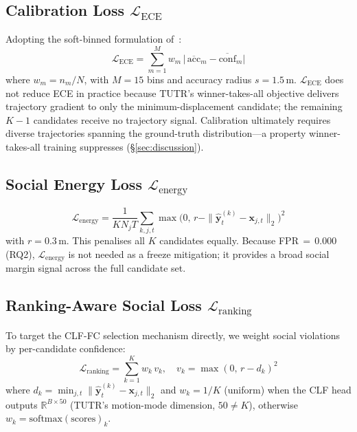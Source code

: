 \documentclass[journal]{IEEEtran}
\begin{document}
\subsection{Calibration Loss \texorpdfstring{$\mathcal{L}_{\text{ECE}}$}{L\_ECE}}

Adopting the soft-binned formulation of~\cite{karandikar2021soft}:
\begin{equation}
  \mathcal{L}_{\text{ECE}} = \sum_{m=1}^{M} w_m\,
  \bigl|\,\overline{\mathrm{acc}}_m - \overline{\mathrm{conf}}_m\bigr|
  \label{eq:lece}
\end{equation}
where $w_m=n_m/N$, with $M{=}15$ bins and accuracy radius
$s{=}1.5$\,m.
$\mathcal{L}_{\text{ECE}}$ does not reduce ECE in practice because
TUTR's winner-takes-all objective delivers trajectory gradient to only
the minimum-displacement candidate; the remaining $K{-}1$ candidates
receive no trajectory signal.
Calibration ultimately requires diverse trajectories spanning the
ground-truth distribution---a property winner-takes-all training
suppresses (\S\ref{sec:discussion}).

\subsection{Social Energy Loss \texorpdfstring{$\mathcal{L}_{\text{energy}}$}{L\_energy}}

\begin{equation}
  \mathcal{L}_{\text{energy}} = \frac{1}{KN_jT}
  \sum_{k,j,t}\max\!\bigl(0,\,r-\|\hat{\mathbf{y}}^{(k)}_t
  -\mathbf{x}_{j,t}\|_2\bigr)^2
  \label{eq:lenergy}
\end{equation}
with $r{=}0.3$\,m. This penalises all $K$ candidates equally.
Because FPR\,\(=\,0.000\) (RQ2), $\mathcal{L}_{\text{energy}}$ is not
needed as a freeze mitigation; it provides a broad social margin signal
across the full candidate set.

\subsection{Ranking-Aware Social Loss \texorpdfstring{$\mathcal{L}_{\text{ranking}}$}{L\_ranking}}

To target the CLF-FC selection mechanism directly, we weight social
violations by per-candidate confidence:
\begin{equation}
  \mathcal{L}_{\text{ranking}} = \sum_{k=1}^{K} w_k\,v_k, \quad
  v_k = \max(0,\,r-d_k)^2
  \label{eq:lranking}
\end{equation}
where $d_k=\min_{j,t}\|\hat{\mathbf{y}}^{(k)}_t-\mathbf{x}_{j,t}\|_2$
and $w_k{=}1/K$ (uniform) when the CLF head outputs
$\mathbb{R}^{B\times 50}$ (TUTR's motion-mode dimension, $50\neq K$),
otherwise $w_k{=}\mathrm{softmax}(\mathrm{scores})_k$.
\end{document}
